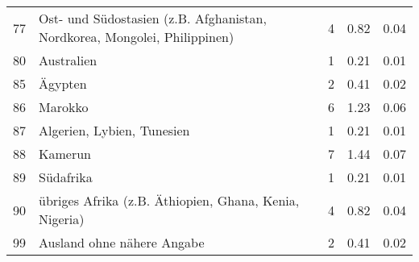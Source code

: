 \begin{longtable}{lXrrr}
        77 & \multicolumn{1}{X}{Ost- und Südostasien (z.B. Afghanistan, Nordkorea, Mongolei, Philippinen)} & %
          \num{4} &
          \num[round-mode=places,round-precision=2]{0.82} &
          \num[round-mode=places,round-precision=2]{0.04} \\

        80 & \multicolumn{1}{X}{Australien} & %
          \num{1} &
          \num[round-mode=places,round-precision=2]{0.21} &
          \num[round-mode=places,round-precision=2]{0.01} \\

        85 & \multicolumn{1}{X}{Ägypten} & %
          \num{2} &
          \num[round-mode=places,round-precision=2]{0.41} &
          \num[round-mode=places,round-precision=2]{0.02} \\

        86 & \multicolumn{1}{X}{Marokko} & %
          \num{6} &
          \num[round-mode=places,round-precision=2]{1.23} &
          \num[round-mode=places,round-precision=2]{0.06} \\

        87 & \multicolumn{1}{X}{Algerien, Lybien, Tunesien} & %
          \num{1} &
          \num[round-mode=places,round-precision=2]{0.21} &
          \num[round-mode=places,round-precision=2]{0.01} \\

        88 & \multicolumn{1}{X}{Kamerun} & %
          \num{7} &
          \num[round-mode=places,round-precision=2]{1.44} &
          \num[round-mode=places,round-precision=2]{0.07} \\

        89 & \multicolumn{1}{X}{Südafrika} & %
          \num{1} &
          \num[round-mode=places,round-precision=2]{0.21} &
          \num[round-mode=places,round-precision=2]{0.01} \\

        90 & \multicolumn{1}{X}{übriges Afrika (z.B. Äthiopien, Ghana, Kenia, Nigeria)} & %
          \num{4} &
          \num[round-mode=places,round-precision=2]{0.82} &
          \num[round-mode=places,round-precision=2]{0.04} \\

        99 & \multicolumn{1}{X}{Ausland ohne nähere Angabe} & %
          \num{2} &
          \num[round-mode=places,round-precision=2]{0.41} &
          \num[round-mode=places,round-precision=2]{0.02} \\


\end{longtable}
